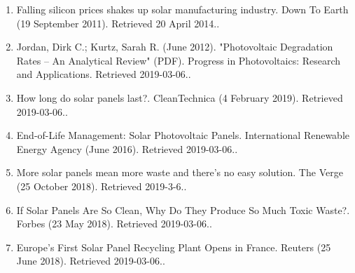 \begin{enumerate}
\item Falling silicon prices shakes up solar manufacturing industry. Down To Earth (19 September 2011). Retrieved 20 April 2014..
\item Jordan, Dirk C.; Kurtz, Sarah R. (June 2012). "Photovoltaic Degradation Rates – An Analytical Review" (PDF). Progress in Photovoltaics: Research and Applications. Retrieved 2019-03-06..
\item How long do solar panels last?. CleanTechnica (4 February 2019). Retrieved 2019-03-06..
\item End-of-Life Management: Solar Photovoltaic Panels. International Renewable Energy Agency (June 2016). Retrieved 2019-03-06..
\item More solar panels mean more waste and there’s no easy solution. The Verge (25 October 2018). Retrieved 2019-3-6..
\item If Solar Panels Are So Clean, Why Do They Produce So Much Toxic Waste?. Forbes (23 May 2018). Retrieved 2019-03-06..
\item Europe's First Solar Panel Recycling Plant Opens in France. Reuters (25 June 2018). Retrieved 2019-03-06..
\end{enumerate}
